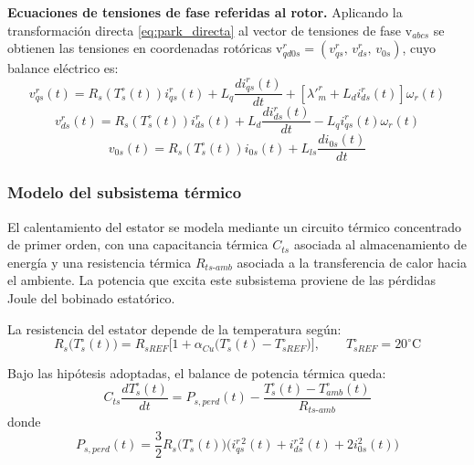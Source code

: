 \documentclass[12pt, a4paper,journal, onecolumn, compsoc]{IEEEtran}
\begin{document}
\textbf{Ecuaciones de tensiones de fase referidas al rotor.} Aplicando la transformación directa \eqref{eq:park_directa} al vector de tensiones de fase $\bm{\mathrm{v}}_{abcs}$ se obtienen las tensiones en coordenadas rotóricas $\bm{\mathrm{v}}^{r}_{qd0s}=(v^r_{qs},\,v^r_{ds},\,v_{0s})$, cuyo balance eléctrico es:
    \begin{equation}\label{eq:vqs_rotor}
        v^r_{qs}(t)=R_s(T_s^\circ(t))i^r_{qs}(t) + L_q\frac{d i^r_{qs}(t)}{dt}+[\lambda'^r_m + L_d i^r_{ds}(t)]\omega_r(t)
    \end{equation}
    \begin{equation}\label{eq:vds_rotor}
        v_{ds}^r(t)=R_s(T_s^\circ(t))i^r_{ds}(t)+L_d\frac{d i^r_{ds}(t)}{dt} - L_qi^r_{qs}(t)\omega_r(t)
    \end{equation}
    \begin{equation}\label{eq:v0s_rotor}
        v_{0s}(t)=R_s(T_s^\circ(t))i_{0s}(t)+L_{ls}\frac{d i_{0s}(t)}{dt}
    \end{equation}

    \subsubsection{Modelo del subsistema térmico}
    El calentamiento del estator se modela mediante un circuito térmico concentrado de primer orden, con una capacitancia térmica \(C_{ts}\) asociada al almacenamiento de energía y una resistencia térmica \(R_{ts\text{-}amb}\) asociada a la transferencia de calor hacia el ambiente. La potencia que excita este subsistema proviene de las pérdidas Joule del bobinado estatórico.

    La resistencia del estator depende de la temperatura según:
    \begin{equation}
        R_s\big(T_s^\circ(t)\big)=R_{sREF}\Big[1+\alpha_{Cu}\big(T_s^\circ(t)-T_{sREF}^\circ\big)\Big], \qquad T_{sREF}^\circ=20^\circ\text{C}
    \end{equation}

    Bajo las hipótesis adoptadas, el balance de potencia térmica queda:
    \begin{equation}
        C_{ts}\frac{dT_s^\circ(t)}{dt}=P_{s,perd}(t)-\frac{T_s^\circ(t)-T_{amb}^\circ(t)}{R_{ts\text{-}amb}}
    \end{equation}
    donde
    \begin{equation}
        P_{s,perd}(t)=\frac{3}{2}R_s\big(T_s^\circ(t)\big)\Big(i_{qs}^{r\,2}(t)+i_{ds}^{r\,2}(t)+2i_{0s}^{2}(t)\Big)
    \end{equation}
\end{document}

